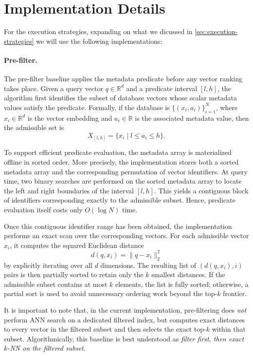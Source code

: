 \section{Implementation Details}\label{subsec:implementation-details}
For the execution strategies, expanding on what we dicussed in \ref{sec:execution-strategies} we will use the following implementations:
\paragraph{Pre-filter.}
The pre-filter baseline applies the metadata predicate before any vector ranking takes place. 
Given a query vector $q \in \mathbb{R}^d$ and a predicate interval $[l,h]$, the algorithm first identifies the subset of database vectors whose scalar metadata values satisfy the predicate. 
Formally, if the database is $\{(x_i, a_i)\}_{i=1}^N$, where $x_i \in \mathbb{R}^d$ is the vector embedding and $a_i \in \mathbb{R}$ is the associated metadata value, then the admissible set is
\[
X_{[l,h]} = \{x_i \mid l \le a_i \le h\}.
\]

To support efficient predicate evaluation, the metadata array is materialized offline in sorted order. 
More precisely, the implementation stores both a sorted metadata array and the corresponding permutation of vector identifiers. 
At query time, two binary searches are performed on the sorted metadata array to locate the left and right boundaries of the interval $[l,h]$. 
This yields a contiguous block of identifiers corresponding exactly to the admissible subset. 
Hence, predicate evaluation itself costs only $O(\log N)$ time.

Once this contiguous identifier range has been obtained, the implementation performs an exact scan over the corresponding vectors. 
For each admissible vector $x_i$, it computes the squared Euclidean distance
\[
d(q, x_i) = \|q - x_i\|_2^2
\]
by explicitly iterating over all $d$ dimensions. 
The resulting list of $(d(q,x_i), i)$ pairs is then partially sorted to retain only the $k$ smallest distances. 
If the admissible subset contains at most $k$ elements, the list is fully sorted; otherwise, a partial sort is used to avoid unnecessary ordering work beyond the top-$k$ frontier.

It is important to note that, in the current implementation, pre-filtering does \emph{not} perform ANN search on a dedicated filtered index, 
but computes exact distances to every vector in the filtered subset and then selects the exact top-$k$ within that subset. 
Algorithmically, this baseline is best understood as \emph{filter first, then exact $k$-NN on the filtered subset}.

